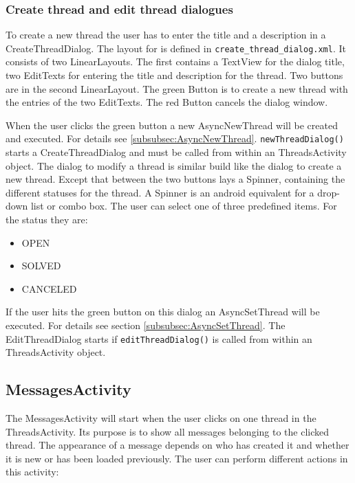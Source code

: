 \documentclass[12pt,a4paper,oneside]{report}
\newcommand{\code}[1]{\lstinline{#1}}
\begin{document}
\subsubsection{Create thread and edit thread dialogues}
To create a new thread the user has to enter the title and a description in a CreateThreadDialog. The layout for is defined in \code{create_thread_dialog.xml}. It consists of two LinearLayouts. The first contains a TextView for the dialog title, two EditTexts for entering the title and description for the thread. Two buttons are in the second LinearLayout. The green Button is to create a new thread with the entries of the two EditTexts. The red Button cancels the dialog window.

When the user clicks the green button a new AsyncNewThread will be created and executed. For details see \ref{subsubsec:AsyncNewThread}. \code{newThreadDialog()} starts a CreateThreadDialog and must be called from within an ThreadsActivity object.
The dialog to modify a thread is similar build like the dialog to create a new thread. Except that between the two buttons lays a Spinner, containing the different statuses for the thread. A Spinner is an android equivalent for a drop-down list or combo box. The user can select one of three predefined items. For the status they are:
\begin{itemize}
\item OPEN
\item SOLVED
\item CANCELED
\end{itemize}


If the user hits the green button on this dialog an AsyncSetThread will be executed. For details see section \ref{subsubsec:AsyncSetThread}. The EditThreadDialog starts if \code{editThreadDialog()} is called from within an ThreadsActivity object.

\subsection{MessagesActivity}
The MessagesActivity will start when the user clicks on one thread in the ThreadsActivity. Its purpose is to show all messages belonging to the clicked thread. The appearance of a message depends on who has created it and whether it is new or has been loaded previously. The user can perform different actions in this activity:
\end{document}
